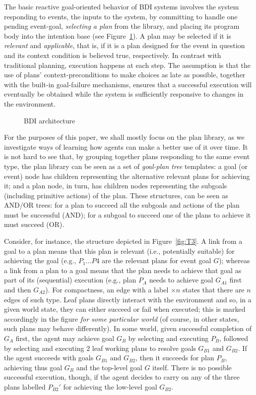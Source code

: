 \documentclass{article}
\begin{document}
The basic reactive goal-oriented behavior of BDI systems involves the system
responding to events, the inputs to the system, by committing to handle one
pending event-goal, \textit{selecting a plan} from the library, and placing its
program body  into the intention base (see Figure~\ref{fig:BDI_description}).
A plan may be selected if it is \textit{relevant} and \textit{applicable}, that is, if it
is a plan designed for the event in question and its context condition is
believed true, respectively.
In contrast with traditional planning, execution happens at each step. The
assumption is that the use of plans' context-preconditions to make choices as
late as possible, together with the built-in goal-failure mechanisms, ensures
that a successful execution will eventually be obtained while the system is
sufficiently responsive to changes in the environment.

\begin{figure}

\caption{BDI architecture}
\label{fig:BDI_description}
\end{figure}


For the purposes of this paper, we shall mostly focus on the plan library, as we
investigate ways of learning how agents can make a better use of it over time.
It is not hard to see that, by grouping together plans responding to the same
event type, the plan library can be seen as a set of \emph{goal-plan tree}
templates: a goal (or event) node has children representing the alternative
relevant plans for achieving it; and a plan node, in turn, has children nodes
representing the subgoals (including primitive actions) of the plan.
These structures, can be seen as AND/OR trees: for a plan to succeed all the
subgoals and actions of the plan must be successful (AND); for a subgoal to
succeed one of the plans to achieve it must succeed (OR).

Consider, for instance, the structure depicted in
Figure~\ref{fig:T3}.
A link from a goal to a plan means that this plan is relevant (i.e., potentially
suitable) for achieving the goal (e.g., $P_1 \ldots P4$ are the relevant
plans for event goal $G$); whereas a link from a plan to a goal means that the
plan needs to achieve that goal as part of its (sequential) execution (e.g., plan
$P_A$ needs to achieve goal $G_{A1}$ first and then $G_{A2}$).
For compactness, an edge with a label $\times n$ states that there are $n$ edges
of such type.
Leaf plans directly interact with the environment and so, in a given world state,
they can either succeed or fail when executed; this is marked accordingly in the
figure \emph{for some particular world} (of course, in other states, such plans
may behave differently).
In some world, given successful completion of $G_A$ first, the agent may achieve goal $G_B$ by selecting and
executing $P_B$, followed by selecting and executing $2$ leaf working plans to
resolve goals $G_{B1}$ and $G_{B2}$. If the agent succeeds with goals $G_{B1}$
and $G_{B2}$, then it succeeds for plan $P_B$, achieving thus goal $G_B$ and the
top-level goal $G$ itself. There is no possible successful execution, though, if
the agent decides to carry on any of the three plans labelled $P_{B2}'$ for
achieving the low-level goal $G_{B2}$.
\end{document}
